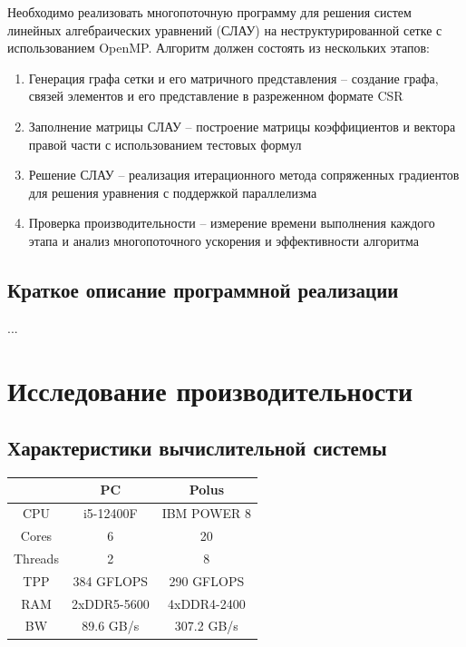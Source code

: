 \documentclass[12pt, a4paper]{article}
\begin{document}
Необходимо реализовать многопоточную программу для решения систем линейных алгебраических уравнений (СЛАУ) на неструктурированной сетке с использованием OpenMP. Алгоритм должен состоять из нескольких этапов:

\begin{enumerate}
	\item Генерация графа сетки и его матричного представления – создание графа, связей элементов и его представление в разреженном формате CSR
	\item Заполнение матрицы СЛАУ – построение матрицы коэффициентов и вектора правой части с использованием тестовых формул
	\item Решение СЛАУ – реализация итерационного метода сопряженных градиентов для решения уравнения с поддержкой параллелизма
	\item Проверка производительности – измерение времени выполнения каждого этапа и анализ многопоточного ускорения и эффективности алгоритма
\end{enumerate}


\subsection{Краткое описание программной реализации}

...


\newpage

\section{Исследование производительности}

\subsection{Характеристики вычислительной системы}

\begin{center}
	\setlength{\tabcolsep}{30pt}
	\renewcommand{\arraystretch}{1.5}
	\begin{tabular}{ c|c|c } 
		 & PC & Polus \\ 
		\hline
		CPU  & i5-12400F & IBM POWER 8 \\ 
		Cores & 6 & 20 \\ 
		Threads & 2 & 8 \\
		TPP & 384 GFLOPS & 290 GFLOPS \\
		RAM & 2xDDR5-5600  & 4xDDR4-2400 \\
		BW & 89.6 GB/s & 307.2 GB/s \\
	\end{tabular}
\end{center}
\end{document}
